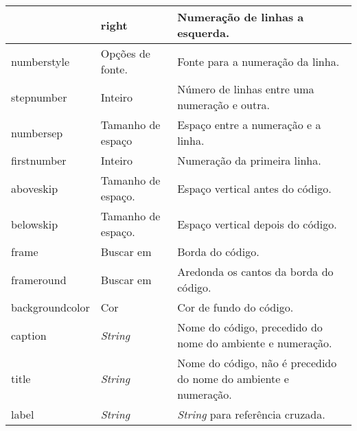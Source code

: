 \begin{tabular}{llp{9cm}}
    & \textsf{right} & Numeração de linhas a esquerda. \\ \hline
    \textsf{numberstyle} & Opções de fonte. & Fonte para a numeração da linha. \\ \hline
    \textsf{stepnumber} & Inteiro & Número de linhas entre uma numeração e outra. \\ \hline
    \textsf{numbersep} & Tamanho de espaço & Espaço entre a numeração e a linha. \\ \hline
    \textsf{firstnumber} & Inteiro & Numeração da primeira linha. \\ \hline
    \textsf{aboveskip} & Tamanho de espaço. & Espaço vertical antes do código. \\ \hline
    \textsf{belowskip} & Tamanho de espaço. & Espaço vertical depois do código. \\ \hline
    \textsf{frame} & Buscar em \cite{Moses07} & Borda do código. \\ \hline
    \textsf{frameround} & Buscar em \cite{Moses07} & Aredonda os cantos da borda do código. \\ \hline
    \textsf{backgroundcolor} & Cor & Cor de fundo do código. \\ \hline
    \textsf{caption} &  \textit{String} & Nome do código, precedido do nome do ambiente e numeração. \\ \hline
    \textsf{title} & \textit{String} & Nome do código, não é precedido do nome do ambiente e numeração. \\ \hline
    \textsf{label} & \textit{String} & \textit{String} para referência cruzada. \\ \hline
\end{tabular}
